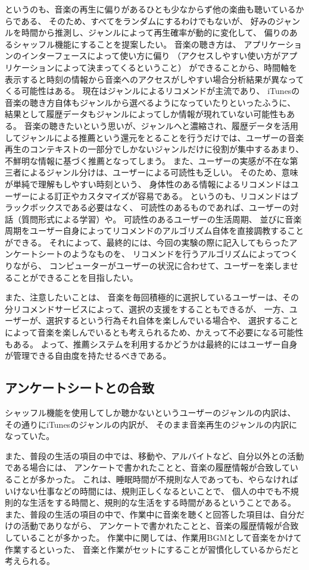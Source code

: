 \documentclass[11pt, twocolumn]{jsarticle}
\begin{document}
というのも、音楽の再生に偏りがあるひとも少なからず他の楽曲も聴いているからである、
そのため、すべてをランダムにするわけでもないが、
好みのジャンルを時間から推測し、ジャンルによって再生確率が動的に変化して、
偏りのあるシャッフル機能にすることを提案したい。
音楽の聴き方は、
アプリケーションのインターフェースによって使い方に偏り
（アクセスしやすい使い方がアプリケーションによって決まってくるということ）
ができることから、時間軸を表示すると時刻の情報から音楽へのアクセスがしやすい場合分析結果が異なってくる可能性はある。
現在はジャンルによるリコメンドが主流であり、
iTunesの音楽の聴き方自体もジャンルから選べるようになっていたりといったふうに、
結果として履歴データもジャンルによってしか情報が現れていない可能性もある。
音楽の聴きたいという思いが、ジャンルへと濃縮され、履歴データを活用してジャンルによる推薦という還元をとることを行うだけでは、ユーザーの音楽再生のコンテキストの一部分でしかないジャンルだけに役割が集中するあまり、
不鮮明な情報に基づく推薦となってしまう。
また、ユーザーの実感が不在な第三者によるジャンル分けは、ユーザーによる可読性も乏しい。
そのため、意味が単純で理解もしやすい時刻という、
身体性のある情報によるリコメンドはユーザーによる訂正やカスタマイズが容易である。
というのも、リコメンドはブラックボックスである必要はなく、
可読性のあるものであれば、ユーザーの対話（質問形式による学習）や。
可読性のあるユーザーの生活周期、
並びに音楽周期をユーザー自身によってリコメンドのアルゴリズム自体を直接調教することができる。
それによって、最終的には、今回の実験の際に記入してもらったアンケートシートのようなものを、
リコメンドを行うアルゴリズムによってつくりながら、
コンピューターがユーザーの状況に合わせて、ユーザーを楽しませることができることを目指したい。

また、注意したいことは、
音楽を毎回積極的に選択しているユーザーは、その分リコメンドサービスによって、選択の支援をすることもできるが、
一方、ユーザーが、選択するという行為それ自体を楽しんでいる場合や、
選択することによって音楽を楽しんでいるとも考えられるため、かえって不必要になる可能性もある。
よって、推薦システムを利用するかどうかは最終的にはユーザー自身が管理できる自由度を持たせるべきである。

\subsection{アンケートシートとの合致}
シャッフル機能を使用してしか聴かないというユーザーのジャンルの内訳は、
その通りにiTunesのジャンルの内訳が、
そのまま音楽再生のジャンルの内訳になっていた。

また、普段の生活の項目の中では、移動や、アルバイトなど、自分以外との活動である場合には、
アンケートで書かれたことと、音楽の履歴情報が合致していることが多かった。
これは、睡眠時間が不規則な人であっても、やらなければいけない仕事などの時間には、規則正しくなるといことで、
個人の中でも不規則的な生活をする時間と、規則的な生活をする時間があるということである。
また、普段の生活の項目の中で、作業中に音楽を聴くと回答した項目は、自分だけの活動でありながら、
アンケートで書かれたことと、音楽の履歴情報が合致していることが多かった。
作業中に関しては、作業用BGMとして音楽をかけて作業するといった、
音楽と作業がセットにすることが習慣化しているからだと考えられる。
\end{document}
